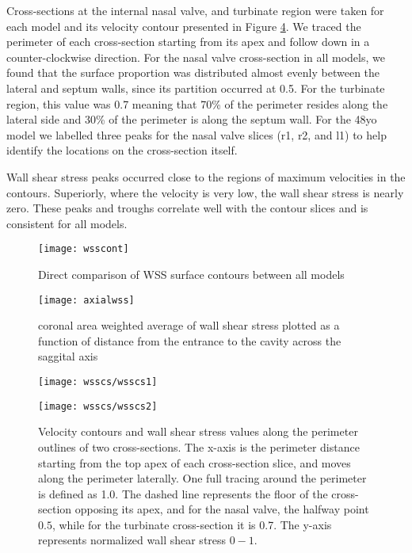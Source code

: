 Cross-sections at the internal nasal valve, and turbinate region were taken for each model and its velocity contour presented in Figure \ref{fig:wcs}. We traced the perimeter of each cross-section starting from its apex and follow down in a counter-clockwise direction. For the nasal valve cross-section in all models, we found that the surface proportion was distributed almost evenly between the lateral and septum walls, since its partition occurred at 0.5. For the turbinate region, this value was 0.7 meaning that 70\% of the perimeter resides along the lateral side and 30\% of the perimeter is along the septum wall. For the 48yo model we labelled three peaks for the nasal valve slices (r1, r2, and l1) to help identify the locations on the cross-section itself. 

Wall shear stress peaks occurred close to the regions of maximum velocities in the contours. Superiorly, where the velocity is very low, the wall shear stress is nearly zero. These peaks and troughs correlate well with the contour slices and is consistent for all models.

\begin{figure} 
  \texttt{[image: wsscont]}
  \caption{Direct comparison of WSS surface contours between all models}
    \label{fig:wcont}
\end{figure}

\begin{figure} 
  \texttt{[image: axialwss]}
  \caption{coronal area weighted average of wall shear stress plotted as a function of distance from the entrance to the cavity across the saggital axis}
  \label{fig:wax}
\end{figure}

\begin{figure} 
  \texttt{[image: wsscs/wsscs1]}
  \label{fig:wcs}
\end{figure}

\begin{figure} 
  \texttt{[image: wsscs/wsscs2]}
  \caption{Velocity contours and wall shear stress values along the perimeter outlines of two cross-sections. The x-axis is the perimeter distance starting from the top apex of each cross-section slice, and moves along the perimeter laterally. One full tracing around the perimeter is defined as 1.0. The dashed line represents the floor of the cross-section opposing its apex, and for the nasal valve, the halfway point \(0.5\), while for the turbinate cross-section it is 0.7. The y-axis represents normalized wall shear stress \(0 - 1\).}
  \label{fig:wcs}
\end{figure}

